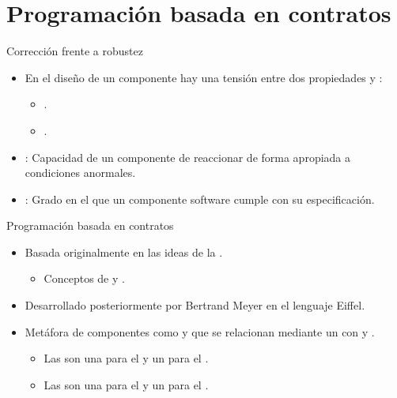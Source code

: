 \section{Programación basada en contratos}

\begin{frame}[t]{Corrección frente a robustez}
\begin{itemize}
  \item En el diseño de un componente hay una tensión entre
        dos propiedades  y :
    \begin{itemize}
      \item {}.
      \item {}.
    \end{itemize} 

  \vfill\pause
  \item {}: Capacidad de un componente de reaccionar
        de forma apropiada a condiciones anormales.

  \vfill\pause
  \item {}: Grado en el que un componente software
        cumple con su especificación.
\end{itemize}
\end{frame}

\begin{frame}[t]{Programación basada en contratos}
\begin{itemize}
  \item Basada originalmente en las ideas de la .
    \begin{itemize}
      \item Conceptos de  y .
    \end{itemize}
  \vfill\pause
  \item Desarrollado posteriormente por Bertrand Meyer en el lenguaje Eiffel.
  \vfill
  \item Metáfora de componentes como  y 
        que se relacionan mediante un  con 
         y .
    \begin{itemize}
      \item\pause Las  son una 
           para el  y un
           para el .
      \item\pause Las  son una
           para el  y un
           para el .
    \end{itemize}
\end{itemize}
\end{frame}

